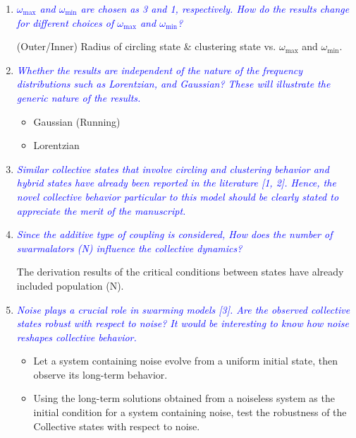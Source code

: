 \documentclass{article}
\begin{document}
\begin{enumerate}
    \item \textcolor{blue}{\textit{$\omega_{\max}$ and $\omega_{\min}$ are chosen as 3 and 1, respectively. How do the results change for different choices of $\omega_{\max}$ and $\omega_{\min}$?}}
    
    (Outer/Inner) Radius of circling state \& clustering state vs. $\omega_{\max}$ and $\omega_{\min}$.

    \item \textcolor{blue}{\textit{Whether the results are independent of the nature of the frequency distributions such as Lorentzian, and Gaussian? These will illustrate the generic nature of the results.}}
    
    \begin{itemize}
        \item Gaussian (Running)
        \item Lorentzian
    \end{itemize}

    \item \textcolor{blue}{\textit{Similar collective states that involve circling and clustering behavior and hybrid states have already been reported in the literature [1, 2]. Hence, the novel collective behavior particular to this model should be clearly stated to appreciate the merit of the manuscript.}}
    
    \item \textcolor{blue}{\textit{Since the additive type of coupling is considered, How does the number of swarmalators (N) influence the collective dynamics?}}

    The derivation results of the critical conditions between states have already included population (N).

    \item \textcolor{blue}{\textit{Noise plays a crucial role in swarming models [3]. Are the observed collective states robust with respect to noise? It would be interesting to know how noise reshapes collective behavior.}}

    \begin{itemize}
        \item Let a system containing noise evolve from a uniform initial state, then observe its long-term behavior.
        \item Using the long-term solutions obtained from a noiseless system as the initial condition for a system containing noise, test the robustness of the Collective states with respect to noise.
    \end{itemize}

\end{enumerate}
\end{document}
